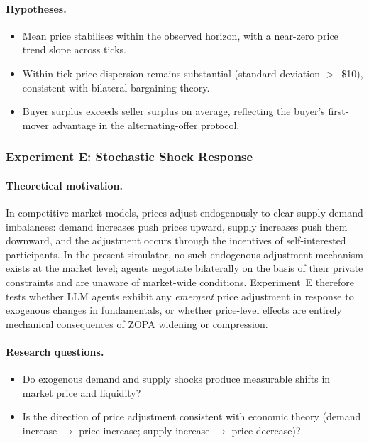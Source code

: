 \paragraph{Hypotheses.}
\begin{itemize}
    \item[\textbf{H-D1.}] Mean price stabilises within the observed horizon, with a near-zero price trend slope across ticks.
    \item[\textbf{H-D2.}] Within-tick price dispersion remains substantial (standard deviation $>$~\$10), consistent with bilateral bargaining theory.
    \item[\textbf{H-D3.}] Buyer surplus exceeds seller surplus on average, reflecting the buyer's first-mover advantage in the alternating-offer protocol.
\end{itemize}

\subsubsection{Experiment E: Stochastic Shock Response}
\label{sec:exp-shock}

\paragraph{Theoretical motivation.}
In competitive market models, prices adjust endogenously to clear supply-demand imbalances: demand increases push prices upward, supply increases push them downward, and the adjustment occurs through the incentives of self-interested participants.  In the present simulator, no such endogenous adjustment mechanism exists at the market level; agents negotiate bilaterally on the basis of their private constraints and are unaware of market-wide conditions.  Experiment~E therefore tests whether LLM agents exhibit any \emph{emergent} price adjustment in response to exogenous changes in fundamentals, or whether price-level effects are entirely mechanical consequences of ZOPA widening or compression.

\paragraph{Research questions.}
\begin{itemize}
    \item[\textbf{RQ-E1.}] Do exogenous demand and supply shocks produce measurable shifts in market price and liquidity?
    \item[\textbf{RQ-E2.}] Is the direction of price adjustment consistent with economic theory (demand increase $\to$ price increase; supply increase $\to$ price decrease)?
\end{itemize}

